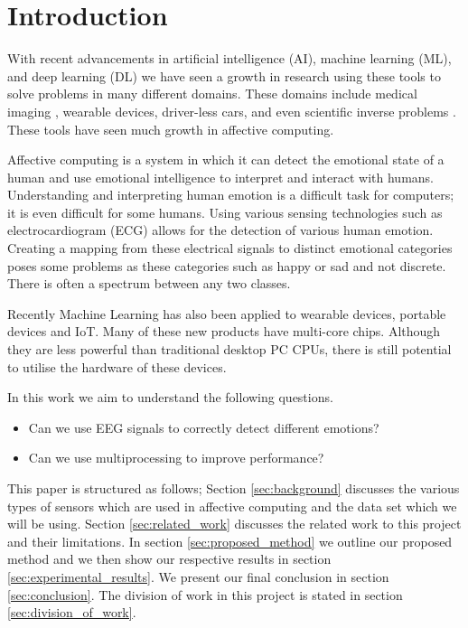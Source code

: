 \section{Introduction}
With recent advancements in
artificial intelligence (AI),
machine learning (ML),
and deep learning (DL)
we have seen a growth in
research using these tools to
solve problems in many different domains.
These domains include medical imaging \cite{Greenspan:2016},
wearable devices,
driver-less cars,
and even scientific inverse problems \cite{laanait2019exascale}.
These tools have seen much growth in affective computing.

Affective computing is a system in which it can detect the
emotional state of a human and use emotional intelligence
to interpret and interact with humans.
Understanding and interpreting human emotion is a
difficult task for computers;
it is even difficult for some humans.
Using various sensing technologies such as electrocardiogram (ECG)
allows for the detection of various human emotion.
Creating a mapping from these electrical signals to
distinct emotional categories poses some problems as
these categories such as happy or sad and not discrete.
There is often a spectrum between any two classes.

Recently Machine Learning has also been applied to wearable devices,
portable devices and IoT.
Many of these new products have multi-core chips.
Although they are less powerful than traditional desktop PC
CPUs, there is still potential to utilise the hardware of these devices.

In this work we aim to understand the following questions.
\begin{itemize}
    \item Can we use EEG signals to correctly detect different emotions?
    \item Can we use multiprocessing to improve performance?
\end{itemize}

This paper is structured as follows;
Section \ref{sec:background} discusses the various types of sensors
which are used in affective computing and the data set which we will be using.
%
Section \ref{sec:related_work} discusses the related work to this project
and their limitations.
%
In section \ref{sec:proposed_method} we outline our proposed method
and we then show our respective results in section \ref{sec:experimental_results}.
%
We present our final conclusion in section \ref{sec:conclusion}.
%
The division of work in this project is stated in section
\ref{sec:division_of_work}.

